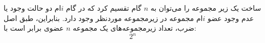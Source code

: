 \p
ساخت یک زیر مجموعه را می‌توان به
$n$
گام تقسیم کرد که در گام
$i$ام
دو حالت وجود یا عدم وجود عضو
$i$ام
مجموعه در زیرمجموعه موردنظر وجود دارد.
بنابراین، طبق اصل ضرب، تعداد زیرمجموعه‌های یک مجموعه
$n$
عضوی برابر است با:
$$2^n$$